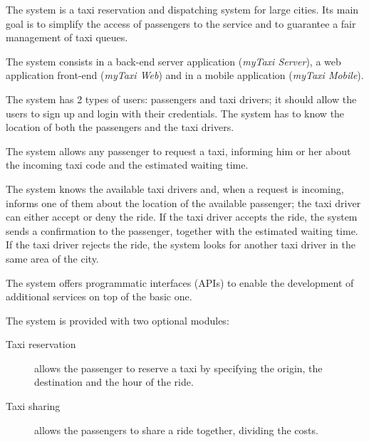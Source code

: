 The system is a taxi reservation and dispatching system for large cities. Its main goal is to simplify the access of passengers to the service and to guarantee a fair management of taxi queues.

The system consists in a back-end server application (\emph{myTaxi Server}), a web application front-end (\emph{myTaxi Web}) and in a mobile application (\emph{myTaxi Mobile}).

The system has 2 types of users: passengers and taxi drivers; it should allow the users to sign up and login with their credentials.
The system has to know the location of both the passengers and the taxi drivers.

The system allows any passenger to request a taxi, informing him or her about the incoming taxi code and the estimated waiting time.

The system knows the available taxi drivers and, when a request is incoming, informs one of them about the location of the available passenger; the taxi driver can either accept or deny the ride.
If the taxi driver accepts the ride, the system sends a confirmation to the passenger, together with the estimated waiting time.
If the taxi driver rejects the ride, the system looks for another taxi driver in the same area of the city.

The system offers programmatic interfaces (APIs) to enable the development of additional services on top of the basic one.

The system is provided with two optional modules:
\begin{description}
\item[Taxi reservation] allows the passenger to reserve a taxi by specifying the origin, the destination and the hour of the ride.
\item[Taxi sharing] allows the passengers to share a ride together, dividing the costs.
\end{description}
